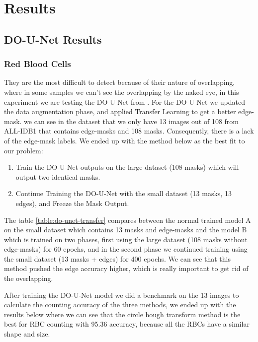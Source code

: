 \documentclass[conference]{IEEEtran}
\begin{document}
\section{Results}
\subsection{DO-U-Net Results}
\subsubsection{Red Blood Cells}
\hspace{\parindent}
They are the most difficult to detect because of their nature of overlapping, where in some samples we can't see the overlapping by the naked eye, in this experiment we are testing the DO-U-Net from \cite{10.1007/978-3-030-44584-3_31}.
For the DO-U-Net we updated the data augmentation phase, and applied Transfer Learning to get a better edge-mask. we can see in the dataset that we only have 13 images out of 108 from ALL-IDB1 that contains edge-masks and 108 masks. Consequently, there is a lack of the edge-mask labels.
We ended up with the method below as the best fit to our problem:

\begin{enumerate}
    \item Train the DO-U-Net outputs on the large dataset (108 masks) which will output two identical masks.
    \item Continue Training the DO-U-Net with the small dataset (13 masks, 13 edges), and Freeze the Mask Output.
\end{enumerate}

The table \ref{table:do-unet-transfer} compares between the normal trained model A on the small dataset which contains 13 masks and edge-masks and the model B which is trained on two phases, first using the large dataset (108 masks without edge-masks) for 60 epochs, and in the second phase we continued training using the small dataset (13 masks + edges) for 400 epochs.
We can see that this method pushed the edge accuracy higher, which is really important to get rid of the overlapping.



After training the DO-U-Net model we did a benchmark on the 13 images to calculate the counting accuracy of the three methods, we ended up with the results below where we can see that the circle hough transform method is the best for RBC counting with 95.36 accuracy, because all the RBCs have a similar shape and size.
\end{document}
